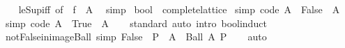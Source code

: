 \begin{isabellebody}
%
\isadelimproof
\ \ %
\endisadelimproof
%
\isatagproof
{}\isamarkupfalse%
\ le{\isacharunderscore}{\kern0pt}Sup{\isacharunderscore}{\kern0pt}iff\ {\isacharbrackleft}{\kern0pt}of\ {\isacharunderscore}{\kern0pt}\ {\isachardoublequoteopen}f\ {\isacharbackquote}{\kern0pt}\ A{\isachardoublequoteclose}{\isacharbrackright}{\kern0pt}\ \isamarkupfalse%
\ simp%
\endisatagproof
{\isafoldproof}%
%
\isadelimproof
\isanewline
%
\endisadelimproof
\isanewline
{}\isamarkupfalse%
%
\isadelimdocument
%
\endisadelimdocument
%
\isatagdocument
%
\isamarkuptrue%
%
\endisatagdocument
{\isafolddocument}%
%
\isadelimdocument
%
\endisadelimdocument
{}\isamarkupfalse%
\ bool\ {\isacharcolon}{\kern0pt}{\isacharcolon}{\kern0pt}\ complete{\isacharunderscore}{\kern0pt}lattice\isanewline
{}\isanewline
\isanewline
{}\isamarkupfalse%
\ {\isacharbrackleft}{\kern0pt}simp{\isacharcomma}{\kern0pt}\ code{\isacharbrackright}{\kern0pt}{\isacharcolon}{\kern0pt}\ {\isachardoublequoteopen}{\isasymSqinter}A\ {\isasymlongleftrightarrow}\ False\ {\isasymnotin}\ A{\isachardoublequoteclose}\isanewline
\isanewline
{}\isamarkupfalse%
\ {\isacharbrackleft}{\kern0pt}simp{\isacharcomma}{\kern0pt}\ code{\isacharbrackright}{\kern0pt}{\isacharcolon}{\kern0pt}\ {\isachardoublequoteopen}{\isasymSqunion}A\ {\isasymlongleftrightarrow}\ True\ {\isasymin}\ A{\isachardoublequoteclose}\isanewline
\isanewline
{}\isamarkupfalse%
\isanewline
%
\isadelimproof
\ \ %
\endisadelimproof
%
\isatagproof
{}\isamarkupfalse%
\ standard\ {\isacharparenleft}{\kern0pt}auto\ intro{\isacharcolon}{\kern0pt}\ bool{\isacharunderscore}{\kern0pt}induct{\isacharparenright}{\kern0pt}%
\endisatagproof
{\isafoldproof}%
%
\isadelimproof
\isanewline
%
\endisadelimproof
\isanewline
{}\isamarkupfalse%
\isanewline
\isanewline
{}\isamarkupfalse%
\ not{\isacharunderscore}{\kern0pt}False{\isacharunderscore}{\kern0pt}in{\isacharunderscore}{\kern0pt}image{\isacharunderscore}{\kern0pt}Ball\ {\isacharbrackleft}{\kern0pt}simp{\isacharbrackright}{\kern0pt}{\isacharcolon}{\kern0pt}\ {\isachardoublequoteopen}False\ {\isasymnotin}\ P\ {\isacharbackquote}{\kern0pt}\ A\ {\isasymlongleftrightarrow}\ Ball\ A\ P{\isachardoublequoteclose}\isanewline
%
\isadelimproof
\ \ %
\endisadelimproof
%
\isatagproof
{}\isamarkupfalse%
\ auto%
\endisatagproof
{\isafoldproof}%
%
\isadelimproof
\isanewline
%
\endisadelimproof
\isanewline

\end{isabellebody}
